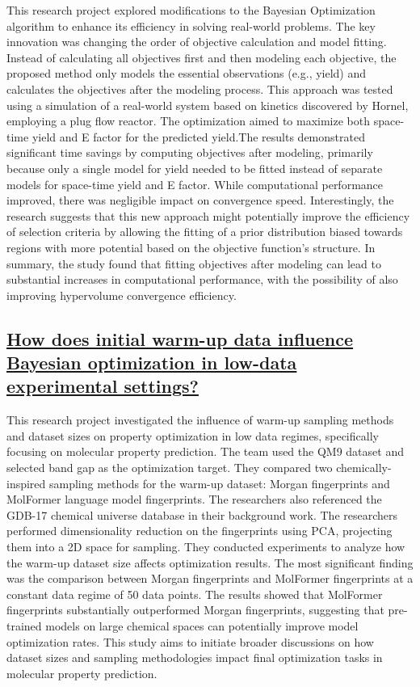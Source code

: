 This research project explored modifications to the Bayesian Optimization algorithm to enhance its efficiency in solving real-world problems. The key innovation was changing the order of objective calculation and model fitting. Instead of calculating all objectives first and then modeling each objective, the proposed method only models the essential observations (e.g., yield) and calculates the objectives after the modeling process. This approach was tested using a simulation of a real-world system based on kinetics discovered by Hornel, employing a plug flow reactor. The optimization aimed to maximize both space-time yield and E factor for the predicted yield.The results demonstrated significant time savings by computing objectives after modeling, primarily because only a single model for yield needed to be fitted instead of separate models for space-time yield and E factor. While computational performance improved, there was negligible impact on convergence speed. Interestingly, the research suggests that this new approach might potentially improve the efficiency of selection criteria by allowing the fitting of a prior distribution biased towards regions with more potential based on the objective function's structure. In summary, the study found that fitting objectives after modeling can lead to substantial increases in computational performance, with the possibility of also improving hypervolume convergence efficiency.
 \subsection*{\href{https://www.youtube.com/watch?v=4gPTMaarQt0}{How does initial warm-up data influence Bayesian optimization in low-data experimental settings?}}

This research project investigated the influence of warm-up sampling methods and dataset sizes on property optimization in low data regimes, specifically focusing on molecular property prediction. The team used the QM9 dataset\cite{ramakrishnan_quantum_2014} and selected band gap as the optimization target. They compared two chemically-inspired sampling methods for the warm-up dataset: Morgan fingerprints and MolFormer language model fingerprints. The researchers also referenced the GDB-17 chemical universe database\cite{ruddigkeit_enumeration_2012} in their background work. The researchers performed dimensionality reduction on the fingerprints using PCA, projecting them into a 2D space for sampling. They conducted experiments to analyze how the warm-up dataset size affects optimization results. The most significant finding was the comparison between Morgan fingerprints and MolFormer fingerprints at a constant data regime of 50 data points. The results showed that MolFormer fingerprints substantially outperformed Morgan fingerprints, suggesting that pre-trained models on large chemical spaces can potentially improve model optimization rates. This study aims to initiate broader discussions on how dataset sizes and sampling methodologies impact final optimization tasks in molecular property prediction.
